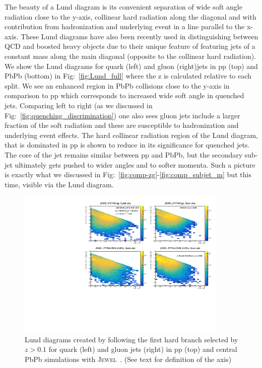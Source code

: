 \documentclass[notoc]{JHEP3}
\newcommand{\jw}{\textsc{Jewel}~}
\begin{document}
The beauty of a Lund diagram is its convenient separation of wide soft angle radiation close to the y-axis, collinear hard radiation along the diagonal and with contribution from hadronization and underlying event in a line parallel to the x-axis. These Lund diagrams have also been recently used in distinguishing between QCD and boosted heavy objects due to their unique feature of featuring jets of a constant mass along the main diagonal (opposite to the collinear hard radiation). We show the Lund diagrams for quark (left) and gluon (right)jets in pp (top) and PbPb (bottom) in Fig:~\ref{fig:Lund_full} where the z is calculated relative to each split. We see an enhanced region in PbPb collisions close to the y-axis in comparison to pp which corresponds to increased wide soft angle in quenched jets. Comparing left to right (as we discussed in Fig:~\ref{fig:quenching_discrimination}) one also sees gluon jets include a larger fraction of the soft radiation and these are susceptible to hadronization and underlying event effects. The hard collinear radiation region of the Lund diagram, that is dominated in pp is shown to reduce in its significance for quenched jets. The core of the jet remains similar between pp and PbPb, but the secondary sub-jet ultimately gets pushed to wider angles and to softer momenta. Such a picture is exactly what we discussed in Fig:~\ref{fig:comp-zg}-\ref{fig:comp_subjet_m} but this time, visible via the Lund diagram. 

\begin{figure}[h]
	   \centering
	   \includegraphics[width=0.9\textwidth]{plots/Individual_LundDiagrams_zrel_hardBranch.pdf}
	   \caption{Lund diagrams created by following the first hard branch selected by $z>0.1$ for quark (left) and gluon jets (right) in pp (top) and central PbPb simulations with \jw. (See text for definition of the axis)}
\label{fig:Lund_hard}
\end{figure}
\end{document}
